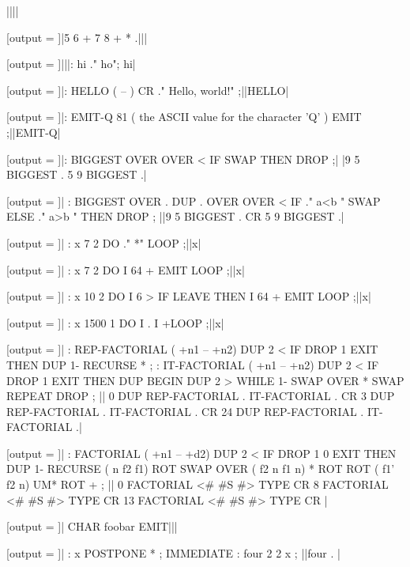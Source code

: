 \RequirePackage{runner}
\newcommand{\result}{}
\makeatletter

||||

[output = \result]|5 6 + 7 8 + * .|||
\typeout{\result}

[output = \result]|||: hi ." ho"; hi|
\typeout{\result}

[output = \result]|: HELLO  ( -- )  CR ." Hello, world!" ;||HELLO|
\typeout{\result}

[output = \result]|: EMIT-Q   81 ( the ASCII value for the character 'Q' ) EMIT ;||EMIT-Q|
\typeout{\result}

[output = \result]|: BIGGEST OVER OVER < IF SWAP THEN DROP ;|%
|9 5 BIGGEST . 5 9 BIGGEST .|
\typeout{\result}

[output = \result]|
  : BIGGEST OVER . DUP .
    OVER OVER < IF
      ." a<b " SWAP
    ELSE
      ." a>b "
    THEN
    DROP ;
||9 5 BIGGEST . CR 5 9 BIGGEST .|
\typeout{\result}

[output = \result]|
  : x 7 2 DO ." *" LOOP ;||x|
\typeout{\result}

[output = \result]|
  : x 7 2 DO I 64 + EMIT LOOP ;||x|
\typeout{\result}

[output = \result]|
  : x 10 2 DO I 6 > IF LEAVE THEN I 64 + EMIT LOOP ;||x|
\typeout{\result}

[output = \result]|
  : x 1500 1 DO I . I +LOOP ;||x|
\typeout{\result}

[output = \result]|
  : REP-FACTORIAL ( +n1 -- +n2)
  DUP 2 < IF DROP 1 EXIT THEN
  DUP 1- RECURSE *
  ;
  : IT-FACTORIAL ( +n1 -- +n2)
  DUP 2 < IF DROP 1 EXIT THEN
  DUP
  BEGIN DUP 2 > WHILE
  1- SWAP OVER * SWAP
  REPEAT DROP
  ;
||
0 DUP REP-FACTORIAL . IT-FACTORIAL . CR
3 DUP REP-FACTORIAL . IT-FACTORIAL . CR
24 DUP REP-FACTORIAL . IT-FACTORIAL .|
\typeout{\result}

[output = \result]|
  : FACTORIAL ( +n1 -- +d2)
  DUP 2 < IF DROP 1 0 EXIT THEN
  DUP 1- RECURSE ( n f2 f1)
  ROT SWAP OVER ( f2 n f1 n)
  * ROT ROT ( f1' f2 n)
  UM* ROT +
  ;
||
0 FACTORIAL <# #S #> TYPE CR
8 FACTORIAL <# #S #> TYPE CR
13 FACTORIAL <# #S #> TYPE CR
|
\typeout{\result}

[output = \result]|
  CHAR foobar EMIT|||
\typeout{\result}

[output = \result]|
  : x POSTPONE * ; IMMEDIATE
  : four 2 2 x ;
||four . |
\typeout{\result}

